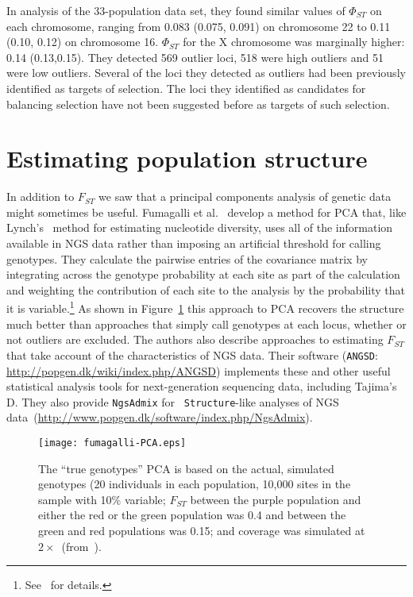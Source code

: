 \documentclass[12pt]{article}
\begin{document}
In analysis of the 33-population data set, they found similar values
of $\Phi_{ST}$ on each chromosome, ranging from 0.083 (0.075, 0.091)
on chromosome 22 to 0.11 (0.10, 0.12) on chromosome 16. $\Phi_{ST}$
for the X chromosome was marginally higher: 0.14 (0.13,0.15). They
detected 569 outlier loci, 518 were high outliers and 51 were low
outliers. Several of the loci they detected as outliers had been
previously identified as targets of selection. The loci they
identified as candidates for balancing selection have not been
suggested before as targets of such selection.

\section*{Estimating population structure}

In addition to $F_{ST}$ we saw that a principal components analysis of
genetic data might sometimes be useful. Fumagalli et
al.~\cite{Fumagalli-etal-2013} develop a method for PCA that, like
Lynch's~\cite{Lynch-2008} method for estimating nucleotide diversity,
uses all of the information available in NGS data rather than imposing
an artificial threshold for calling genotypes. They calculate the
pairwise entries of the covariance matrix by integrating across the
genotype probability at each site as part of the calculation and
weighting the contribution of each site to the analysis by the
probability that it is
variable.\footnote{See~\cite{Fumagalli-etal-2013} for details.} As
shown in Figure~\ref{fig:Fumagalli-PCA} this approach to PCA recovers
the structure much better than approaches that simply call genotypes
at each locus, whether or not outliers are excluded. The authors also
describe approaches to estimating $F_{ST}$ that take account of the
characteristics of NGS data. Their software ({\tt ANGSD}:
\url{http://popgen.dk/wiki/index.php/ANGSD}) implements these and
other useful statistical analysis tools for next-generation sequencing
data, including Tajima's D. They also provide {\tt NgsAdmix} for {\tt
  Structure}-like analyses of NGS
data~(\url{http://www.popgen.dk/software/index.php/NgsAdmix}). 

\begin{figure}
\begin{center}
\texttt{[image: fumagalli-PCA.eps]}
\end{center}
\caption{The ``true genotypes'' PCA is based on the actual, simulated
  genotypes (20 individuals in each population, 10,000 sites in the
  sample with 10\% variable; $F_{ST}$ between the purple population
  and either the red or the green population was 0.4 and between the
  green and red populations was 0.15; and coverage was simulated at
  $2\times$~(from~\cite{Fumagalli-etal-2013}).}\label{fig:Fumagalli-PCA}
\end{figure}
\end{document}
